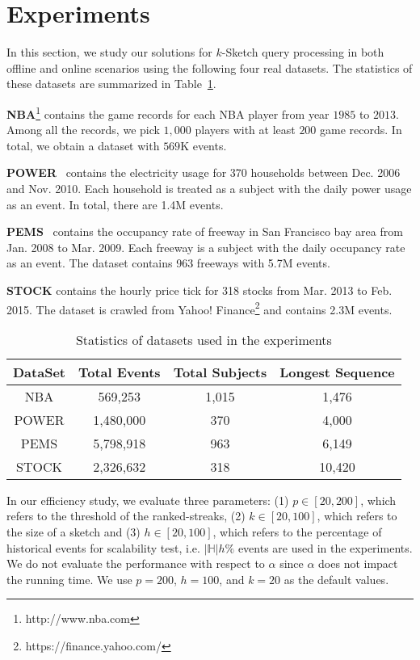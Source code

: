 \section{Experiments}\label{sec:experiment}
In this section, we study our solutions for $k$-Sketch query processing
in both offline and online scenarios using the following 
four real datasets. The statistics of these datasets are 
summarized in Table~\ref{tbl:dataset}.

\noindent\textbf{NBA}\footnote{http://www.nba.com} contains the game records for each NBA player from year $1985$ to $2013$. Among all the records, we pick $1,000$ players with at least $200$ game records. In total, we obtain a dataset with $569$K events.

\noindent\textbf{POWER}~\cite{Lichman2013} contains the electricity usage for 370 households between Dec. 2006 and Nov. 2010. Each household is treated as a subject with the daily power usage as an event. In total, there are 1.4M events.

\noindent\textbf{PEMS}~\cite{choe2002freeway} contains the occupancy rate of freeway in San Francisco bay area from Jan. 2008 to Mar. 2009. Each freeway is a subject with the daily occupancy rate as an event. The dataset contains 963 freeways with 5.7M events.

\noindent\textbf{STOCK} contains the hourly price tick for 318 stocks from Mar. 2013 to Feb. 2015.
The dataset is crawled from Yahoo! Finance\footnote{https://finance.yahoo.com/} and contains 2.3M events.

 
\begin{table}[h]
\caption{Statistics of datasets used in the experiments}
\centering
\begin{tabular}{|c|c|c|c|}
\hline
DataSet & Total Events & Total Subjects  & Longest Sequence \\
\hline
NBA & 569,253 & 1,015&  1,476 \\
\hline
POWER & 1,480,000 & 370 & 4,000 \\
\hline
PEMS & 5,798,918 & 963&  6,149 \\
\hline
STOCK & 2,326,632 & 318&  10,420 \\
\hline
\end{tabular}
\label{tbl:dataset}
\end{table}

In our efficiency study, we evaluate three parameters: (1) $p\in[20,200]$, which refers to the threshold of the ranked-streaks, (2) $k\in[20,100]$, which refers to the size of a sketch and (3) $h\in[20,100]$, which refers to the percentage of historical events for scalability test, i.e. $|\mathbb{H}|h\%$ events are used in the experiments. We do not evaluate the performance with respect to $\alpha$ since $\alpha$ does not impact the running time. We use $p=200$, $h=100$, and $k=20$ as the default values.

